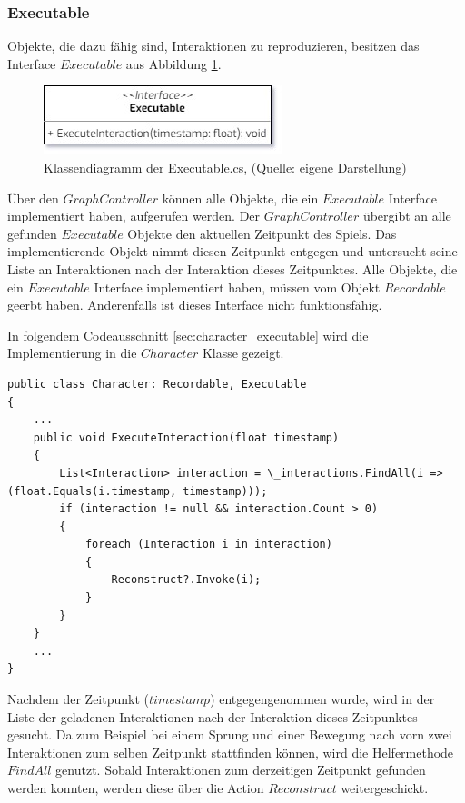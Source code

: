 \subsubsection{Executable}
Objekte, die dazu fähig sind, Interaktionen zu reproduzieren, besitzen das Interface $Executable$ aus Abbildung \ref{fig:executable-cs}.

\begin{figure}[ht]
\centering
\includegraphics[width=0.4\linewidth]{content/pictures/Executable.jpg}
\caption{Klassendiagramm der Executable.cs, (Quelle: eigene Darstellung)}
\label{fig:executable-cs}
\end{figure}

Über den $GraphController$ können alle Objekte, die ein $Executable$ Interface implementiert haben, aufgerufen werden. Der $GraphController$ übergibt an alle gefunden $Executable$ Objekte den aktuellen Zeitpunkt des Spiels. Das implementierende Objekt nimmt diesen Zeitpunkt entgegen und untersucht seine Liste an Interaktionen nach der Interaktion dieses Zeitpunktes. Alle Objekte, die ein $Executable$ Interface implementiert haben, müssen vom Objekt $Recordable$ geerbt haben. Anderenfalls ist dieses Interface nicht funktionsfähig.

In folgendem Codeausschnitt \ref{sec:character_executable} wird die Implementierung in die $Character$ Klasse gezeigt.

\begin{lstlisting}[caption={Ausschnitt aus Character.ts dieses Prototyps}, label={sec:character_executable}]
public class Character: Recordable, Executable
{
    ...
    public void ExecuteInteraction(float timestamp)
    {
        List<Interaction> interaction = \_interactions.FindAll(i => (float.Equals(i.timestamp, timestamp)));
        if (interaction != null && interaction.Count > 0)
        {
            foreach (Interaction i in interaction)
            {
                Reconstruct?.Invoke(i);
            }
        }
    }
    ...
}
\end{lstlisting}

Nachdem der Zeitpunkt ($timestamp$) entgegengenommen wurde, wird in der Liste der geladenen Interaktionen nach der Interaktion dieses Zeitpunktes gesucht. Da zum Beispiel bei einem Sprung und einer Bewegung nach vorn zwei Interaktionen zum selben Zeitpunkt stattfinden können, wird die Helfermethode $FindAll$ genutzt. Sobald Interaktionen zum derzeitigen Zeitpunkt gefunden werden konnten, werden diese über die Action $Reconstruct$ weitergeschickt.

